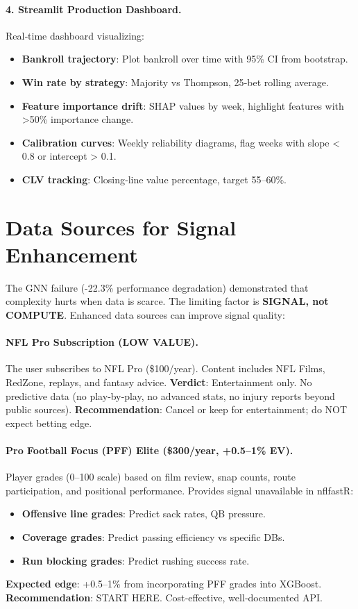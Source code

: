 \paragraph{4. Streamlit Production Dashboard.}
Real‑time dashboard visualizing:
\begin{itemize}
\item \textbf{Bankroll trajectory}: Plot bankroll over time with 95\% CI from bootstrap.
\item \textbf{Win rate by strategy}: Majority vs Thompson, 25‑bet rolling average.
\item \textbf{Feature importance drift}: SHAP values by week, highlight features with >50\% importance change.
\item \textbf{Calibration curves}: Weekly reliability diagrams, flag weeks with slope < 0.8 or intercept > 0.1.
\item \textbf{CLV tracking}: Closing‑line value percentage, target 55--60\%.
\end{itemize}

\section{Data Sources for Signal Enhancement}
\label{sec:data_sources}

The GNN failure (-22.3\% performance degradation) demonstrated that complexity hurts when data is scarce. The limiting factor is \textbf{SIGNAL, not COMPUTE}. Enhanced data sources can improve signal quality:

\paragraph{NFL Pro Subscription (LOW VALUE).}
The user subscribes to NFL Pro (\$100/year). Content includes NFL Films, RedZone, replays, and fantasy advice. \textbf{Verdict}: Entertainment only. No predictive data (no play‑by‑play, no advanced stats, no injury reports beyond public sources). \textbf{Recommendation}: Cancel or keep for entertainment; do NOT expect betting edge.

\paragraph{Pro Football Focus (PFF) Elite (\$300/year, +0.5--1\% EV).}
Player grades (0--100 scale) based on film review, snap counts, route participation, and positional performance. Provides signal unavailable in nflfastR:
\begin{itemize}
\item \textbf{Offensive line grades}: Predict sack rates, QB pressure.
\item \textbf{Coverage grades}: Predict passing efficiency vs specific DBs.
\item \textbf{Run blocking grades}: Predict rushing success rate.
\end{itemize}
\textbf{Expected edge}: +0.5--1\% from incorporating PFF grades into XGBoost. \textbf{Recommendation}: START HERE. Cost‑effective, well‑documented API.

